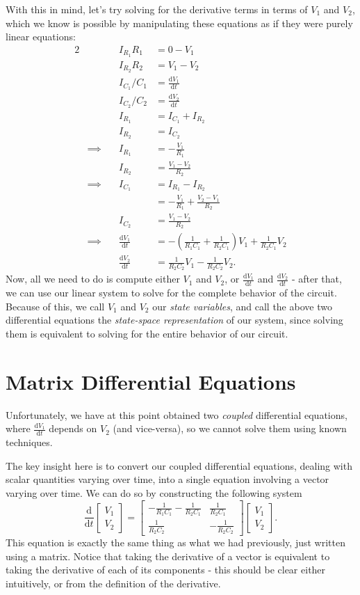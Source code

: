 \documentclass[letterpaper]{article}
\theoremstyle{remark}
\newcommand{\dt}{\mathrm{d}t}
\newcommand{\diff}{\mathrm{d}}
\newcommand{\mat}[1]{\ensuremath{\begin{bmatrix}#1\end{bmatrix}}}
\newcommand{\eqn}[1]{\begin{alignat*}{2}#1\end{alignat*}}
\newcommand*{\thus}{&\implies\quad&}
\begin{document}
With this in mind, let's try solving for the derivative terms in terms of $V_1$ and $V_2$, which we know is possible by manipulating these equations as if they were purely linear equations:
\eqn{
    && I_{R_1}R_1 &= 0 - V_1 \\
    && I_{R_2}R_2 &= V_1 - V_2 \\
    && I_{C_1} / C_1 &= \frac{\diff V_1}{\dt} \\
    && I_{C_2} / C_2 &= \frac{\diff V_2}{\dt} \\
    && I_{R_1} &= I_{C_1} + I_{R_2} \\
    && I_{R_2} &= I_{C_2} \\
    \thus I_{R_1} &= -\frac{V_1}{R_1} \\
    && I_{R_2} &= \frac{V_1 - V_2}{R_2} \\
    \thus I_{C_1} &= I_{R_1} - I_{R_2} \\
    &&&= -\frac{V_1}{R_1}+ \frac{V_2 - V_1}{R_2} \\
    && I_{C_2} &= \frac{V_1 - V_2}{R_2} \\
    \thus \frac{\diff V_1}{\dt} &= -\left(\frac{1}{R_1C_1} + \frac{1}{R_2C_1}\right) V_1 + \frac{1}{R_2C_1}V_2 \\
    && \frac{\diff V_2}{\dt} &= \frac{1}{R_2C_2}V_1 - \frac{1}{R_2C_2}V_2.
}
Now, all we need to do is compute either $V_1$ and $V_2$, or $\frac{\diff V_1}{\dt}$ and $\frac{\diff V_2}{\dt}$ - after that, we can use our linear system to solve for the complete behavior of the circuit. Because of this, we call $V_1$ and $V_2$ our \emph{state variables}, and call the above two differential equations the \emph{state-space representation} of our system, since solving them is equivalent to solving for the entire behavior of our circuit.

\section{Matrix Differential Equations}
Unfortunately, we have at this point obtained two \emph{coupled} differential equations, where $\frac{\diff V_1}{\dt}$ depends on $V_2$ (and vice-versa), so we cannot solve them using known techniques.

The key insight here is to convert our coupled differential equations, dealing with scalar quantities varying over time, into a single equation involving a vector varying over time. We can do so by constructing the following system
\[
    \frac{\diff}{\dt} \mat{V_1 \\ V_2} = \mat{-\frac{1}{R_1C_1} - \frac{1}{R_2C_1} & \frac{1}{R_2C_1} \\ \frac{1}{R_2C_2} & -\frac{1}{R_2C_2}} \mat{V_1 \\ V_2}.
\]
This equation is exactly the same thing as what we had previously, just written using a matrix. Notice that taking the derivative of a vector is equivalent to taking the derivative of each of its components - this should be clear either intuitively, or from the definition of the derivative.
\end{document}
